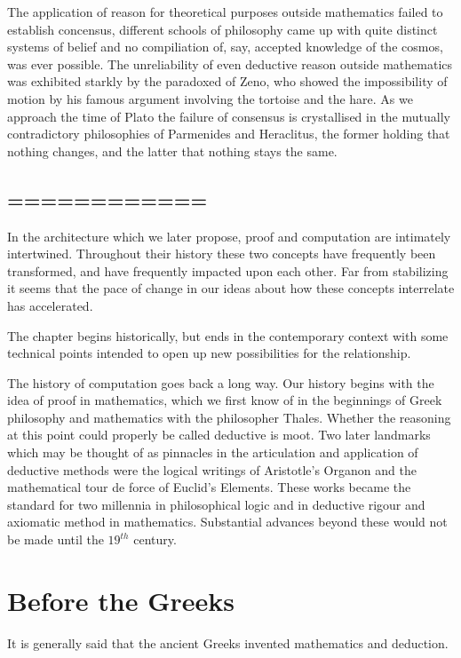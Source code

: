 The application of reason for theoretical purposes outside mathematics failed to
establish concensus, different schools of philosophy came up with quite distinct
systems of belief and no compiliation of, say, accepted knowledge of the cosmos,
was ever possible.
The unreliability of even deductive reason outside mathematics was exhibited
starkly by the paradoxed of Zeno, who showed the impossibility of motion by
his famous argument involving the tortoise and the hare. 
As we approach the time of Plato the failure of consensus is crystallised
in the mutually contradictory philosophies of Parmenides and Heraclitus,
the former holding that nothing changes, and the latter that nothing stays the same.

\subsection{============}

In the architecture which we later propose, proof and computation are
intimately intertwined.
Throughout their history these two concepts have frequently been
transformed, and have frequently impacted upon each other.
Far from stabilizing it seems that the pace of change in our ideas
about how these concepts interrelate has accelerated.

The chapter begins historically, but ends in the contemporary context
with some technical points intended to open up new possibilities for the relationship.

The history of computation goes back a long way.
Our history begins with the idea of proof in mathematics, which we
first know of in the beginnings of Greek philosophy and mathematics
with the philosopher Thales.
Whether the reasoning at this point could properly be called deductive
is moot.
Two later landmarks which may be thought of as pinnacles in the
articulation and application of deductive methods were the logical
writings of Aristotle's Organon and the mathematical tour de force of Euclid's
Elements.
These works became the standard for two millennia in philosophical
logic and in deductive rigour and axiomatic method in mathematics.
Substantial advances beyond these would not be made until the
$19^{th}$ century.

\section{Before the Greeks}

It is generally said that the ancient Greeks invented mathematics and
deduction.

